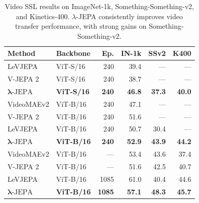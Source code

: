 \documentclass{article} %
\theoremstyle{remark}
\begin{document}
\begin{table}[h]
\centering
\small
\begin{tabular}{llrrrr}
\toprule
Method & Backbone & Ep. & IN-1k & SSv2 & K400 \\
\midrule
LeVJEPA & ViT-S/16 & 240 & 39.4 & --- & --- \\
V-JEPA 2 & ViT-S/16 & 240 & 38.7 & --- & --- \\
\textbf{$\bm{\lambda}\text{-JEPA}$} & \textbf{ViT-S/16} & \textbf{240}
& \textbf{46.8} & \textbf{37.3} & \textbf{40.0} \\
\midrule
VideoMAEv2 & ViT-B/16 & 240 & 47.1 & --- & --- \\
V-JEPA 2 & ViT-B/16 & 240 & 51.6 & --- & --- \\
LeVJEPA & ViT-B/16 & 240 & 50.7 & 30.4 & --- \\
\textbf{$\bm{\lambda}\text{-JEPA}$} & \textbf{ViT-B/16} & \textbf{240}
& \textbf{52.9} & \textbf{43.9} & \textbf{44.2} \\
\midrule
VideoMAEv2 & ViT-B/16 & --- & 53.4 & 43.6 & 37.4 \\
V-JEPA 2 & ViT-B/16 & --- & 51.6 & 42.5 & 40.7 \\
LeVJEPA & ViT-B/16 & 1085 & 61.0 & 40.4 & 44.6 \\
\textbf{$\bm{\lambda}\text{-JEPA}$} & \textbf{ViT-B/16} & \textbf{1085}
& \textbf{57.1} & \textbf{48.3} & \textbf{45.7} \\
\bottomrule
\end{tabular}
\caption{
Video SSL results on ImageNet-1k, Something-Something-v2, and Kinetics-400. $\lambda$-JEPA consistently improves video transfer performance, with strong gains on Something-Something-v2.
}
\end{table}
\end{document}
